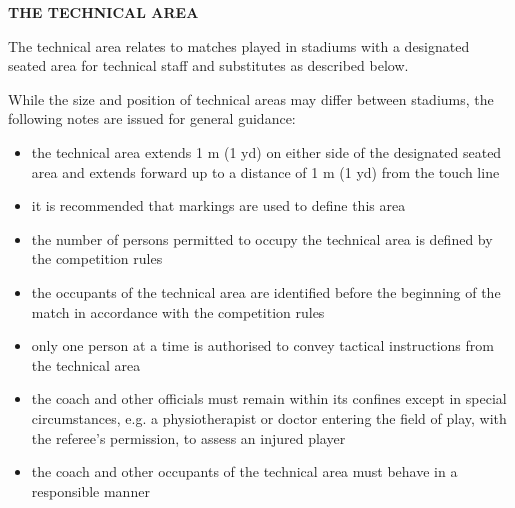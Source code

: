 \clearpage
\sffamily
{\bfseries\color[rgb]{0.4,0.4,0.4}
THE TECHNICAL AREA}
{}

\bigskip

The technical area relates to matches played in stadiums with a designated seated area for technical staff and substitutes as described below.

\bigskip

While the size and position of technical areas may differ between stadiums, the following notes are issued for general guidance:

\begin{itemize}
\item the technical area extends 1 m (1 yd) on either side of the designated seated area and extends forward up to a distance of 1 m (1 yd) from the touch line
\item it is recommended that markings are used to define this area
\item the number of persons permitted to occupy the technical area is defined by the competition rules
\item the occupants of the technical area are identified before the beginning of the match in accordance with the competition rules
\item only one person at a time is authorised to convey tactical instructions from the technical area
\item the coach and other officials must remain within its confines except in special circumstances, e.g. a physiotherapist or doctor entering the field of play, with the referee's permission, to assess an injured player
\item the coach and other occupants of the technical area must behave in a responsible manner
\end{itemize}